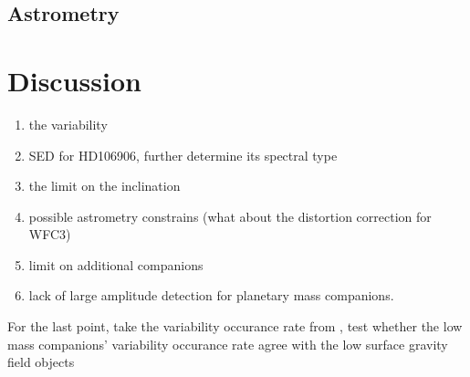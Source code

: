 \documentclass[modern]{aastex62}
\begin{document}
\subsection{Astrometry}

\section{Discussion}
\begin{enumerate}
\item the variability
\item SED for HD106906, further determine its spectral type
\item the limit on the inclination \citep[see][]{Vos2017}
\item possible astrometry constrains (what about the distortion correction for WFC3)
\item limit on additional companions
\item lack of large amplitude detection for planetary mass companions. 
\end{enumerate}
For the last point, take the variability occurance rate from \citep{Vos2017,Metchev2015}, test whether the low mass companions' variability occurance rate agree with the low surface gravity field objects



\end{document}
